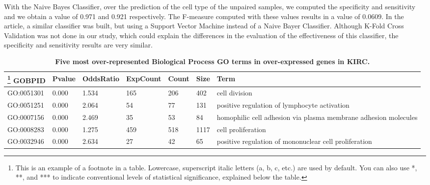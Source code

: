 \documentclass[9pt,twocolumn,twoside]{gsajnl}
\begin{document}
With the Naive Bayes Classifier, over the prediction of the cell type of the unpaired samples, we computed the specificity and sensitivity and we obtain a value of 0.971 and 0.921 respectively. The F-measure computed with these values results in a value of 0.0609. In the \citep{Yang2014} article, a similar classifier was built, but using a Support Vector Machine instead of a Naive Bayer Classifier. Although K-Fold Cross Validation was not done in our study, which could explain the differences in the evaluation of the effectiveness of this classifier, the specificity and sensitivity results are very similar.

\newcolumntype{b}{X}
\begin{table}[htbp]
\centering
\caption{\bf Five most over-represented Biological Process GO terms in over-expressed genes in KIRC. }
\begin{tableminipage}{\textwidth}
\begin{tabularx}{\textwidth}{ssssssb}
\hline
\footnote{This is an example of a footnote in a table. Lowercase, superscript italic letters (a, b, c, etc.) are used by default. You can also use *, **, and *** to indicate conventional levels of statistical significance, explained below the table.}
GOBPID & Pvalue & OddsRatio & ExpCount & Count & Size & Term\\
\hline
GO:0051301 & 0.000 & 1.534 & 165 & 206 & 402 & cell division\\
GO:0051251 & 0.000 & 2.064 & 54 & 77 & 131 & positive regulation of lymphocyte activation\\
GO:0007156 & 0.000 & 2.469 & 35 & 53 & 84 & homophilic cell adhesion via plasma membrane adhesion molecules\\
GO:0008283 & 0.000 & 1.275 & 459 & 518 & 1117 & cell proliferation\\
GO:0032946 & 0.000 & 2.634 & 27 & 42 & 65 & positive regulation of mononuclear cell proliferation\\
\hline
\end{tabularx}
\end{tableminipage}
\end{table}



\end{document}
